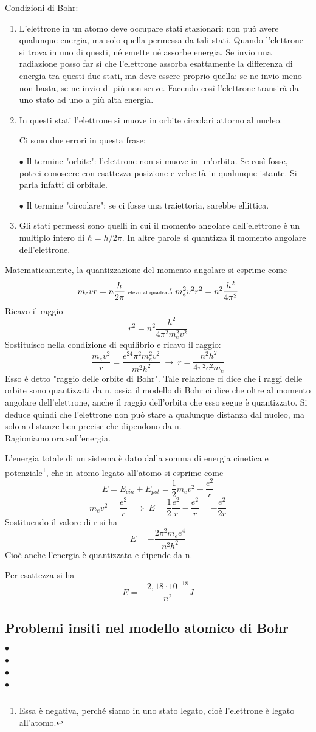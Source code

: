 Condizioni di Bohr:
\begin{enumerate}
  \item L'elettrone in un atomo deve occupare stati stazionari: non può avere qualunque energia, ma solo quella permessa da tali stati. Quando l'elettrone si trova in uno di questi, né emette né assorbe energia. Se invio una radiazione posso far sì che l'elettrone assorba esattamente la differenza di energia tra questi due stati, ma deve essere proprio quella: se ne invio meno non basta, se ne invio di più non serve.
  Facendo così l'elettrone transirà da uno stato ad uno a più alta energia.
  \item In questi stati l'elettrone si muove in orbite circolari attorno al nucleo.
  
  Ci sono due errori in questa frase:

  $\bullet$ Il termine "orbite": l'elettrone non si muove in un'orbita. Se così fosse, potrei conoscere con esattezza posizione e velocità in qualunque istante. Si parla infatti di orbitale.

  $\bullet$ Il termine "circolare": se ci fosse una traiettoria, sarebbe ellittica.
  \item Gli stati permessi sono quelli in cui il momento angolare dell'elettrone è un multiplo intero di $\hbar=h/2\pi$. In altre parole si quantizza il momento angolare dell'elettrone. 
\end{enumerate}
Matematicamente, la quantizzazione del momento angolare si esprime come
$$m_evr=n\frac{h}{2\pi}\ \overrightarrow{\tiny\text{elevo al quadrato}}\ m_e^2v^2r^2=n^2\frac{h^2}{4\pi^2}$$
Ricavo il raggio
$$r^2=n^2\frac{h^2}{4\pi^2m_e^2v^2}$$
Sostituisco nella condizione di equilibrio e ricavo il raggio:
$$\frac{m_ev^2}{r}=\frac{e^24\pi^2m_e^2v^2}{m^2h^2}\ \rightarrow\ r=\frac{n^2h^2}{4\pi^2e^2m_e}$$
Esso è detto "raggio delle orbite di Bohr".
Tale relazione ci dice che i raggi delle orbite sono quantizzati da n, ossia il modello di Bohr ci dice che oltre al momento angolare dell'elettrone, anche il raggio dell'orbita che esso segue è quantizzato. Si deduce quindi che l'elettrone non può stare a qualunque distanza dal nucleo, ma solo a distanze ben precise che dipendono da n.\\
Ragioniamo ora sull'energia.

L'energia totale di un sistema è dato dalla somma di energia cinetica e potenziale\footnote{Essa è negativa, perché siamo in uno stato legato, cioè l'elettrone è legato all'atomo.}, che in atomo legato all'atomo si esprime come
$$E=E_{cin} + E_{pot}=\frac{1}{2}m_ev^2 - \frac{e^2}{r}$$
$$m_ev^2=\frac{e^2}{r}\ \implies\ E=\frac{1}{2}\frac{e^2}{r} - \frac{e^2}{r}=- \frac{e^2}{2r}$$
Sostituendo il valore di r si ha
$$E=-\frac{2\pi^2m_ee^4}{n^2h^2}$$
Cioè anche l'energia è quantizzata e dipende da n.

Per esattezza si ha
$$E=-\frac{2,18\cdot10^{-18}}{n^2}J$$
\subsection{Problemi insiti nel modello atomico di Bohr}
$\bullet$

$\bullet$

$\bullet$

$\bullet$